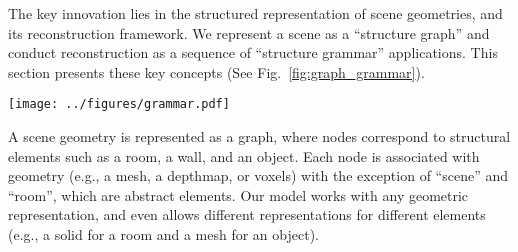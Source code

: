 The key innovation lies in the structured representation of scene
geometries, and its reconstruction framework. We represent a scene as a
``structure graph'' and conduct reconstruction as a
sequence of ``structure grammar'' applications. This section presents
these key concepts (See Fig.~\ref{fig:graph_grammar}).

\begin{figure*}[tb]
\begin{center}
 \texttt{[image: ../figures/grammar.pdf]}
 \end{center}
 \caption{Top
 left: An indoor scene is modeled as a {\em structure graph}, where
 nodes correspond to structural elements such as a room, a door, or an
 object. Each node is associated with a geometry such as a mesh or a
 depthmap, except for the scene and the room nodes. Edges contain their
 geometric relationships. A mesh model can be generated from the graph
 by outputting a mesh from every leaf node (a node without an out-going
 directed edge). Top right: One can drop an arbitrary set of nodes from
 the leaves for the mesh generation. As long as no dangling solid
 undirected edges remain, the mesh is guaranteed to be a
 manifold. Bottom: {\em Structure grammar} defines a set of possible
 transformations of this graph. Our reconstruction process is
 to sequentially apply these rules to recover the structure graph.}
 \label{fig:graph_grammar}
 \vspace{-0.325cm}
\end{figure*}

A scene geometry is represented as a graph, where nodes correspond to
structural elements such as a room, a wall, and an object. Each node is
associated with geometry (e.g., a mesh, a depthmap, or voxels)
with the exception of ``scene'' and ``room'', which are abstract
elements. Our model works with any geometric representation, and even
allows different representations for different elements (e.g., a solid
for a room and a mesh for an object).

